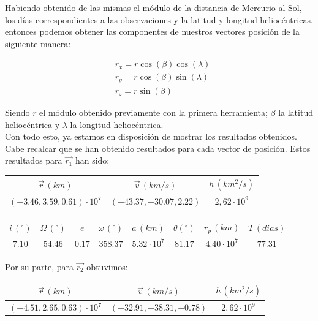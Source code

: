 \documentclass{article}
\numberwithin{equation}{section}
\begin{document}
Habiendo obtenido de las mismas el módulo de la distancia de Mercurio al Sol, los días correspondientes a las observaciones y la latitud y longitud heliocéntricas, entonces podemos obtener las componentes de nuestros vectores posición de la siguiente manera:

\begin{align*}
    &r_{x}=r\cos(\beta)\cos(\lambda) \\
    &r_{y}=r\cos(\beta)\sin(\lambda) \\
    &r_{z}=r\sin(\beta)
\end{align*}

Siendo $r$ el módulo obtenido previamente con la primera herramienta; 
$\beta$ la latitud heliocéntrica y $\lambda$ la longitud heliocéntrica. \\

Con todo esto, ya estamos en disposición de mostrar 
los resultados obtenidos. Cabe recalcar que se han obtenido resultados 
para cada vector de posición. Estos resultados para $\overrightarrow{r_{1}}$ han sido: 

\begin{center}
    \centering
    \begin{tabular}{|c|c|c|}
    \hline
    $\overrightarrow{r}\, (km)$ & $\overrightarrow{v}\, (km/s)$ & $h\, ( km^{2}/s)$  \\ \hline
    $(-3.46,3.59,0.61)\cdot10^7$ & $(-43.37, -30.07, 2.22)$ & $2,62 \cdot 10^{9}$\\ \hline
    \end{tabular}
\end{center}

\begin{center}
    \centering
    \begin{tabular}{|c|c|c|c|c|c|c|c|}
    \hline
     $i\, (^{\circ})$ & $\Omega\, (^\circ)$ & $e$ & $\omega\, (^\circ)$ & $a\, (km)$ & $\theta (^\circ)$ & $r_{p}\, (km)$ & $T\, (dias)$\\ \hline
    $7.10$ & $54.46$ & $0.17$ & $358.37$ & $5.32\cdot 10^{7}$ & $81.17$ & $4.40\cdot 10^{7}$ & $77.31$ \\ \hline
    \end{tabular}
\end{center}
Por su parte, para $\overrightarrow{r_{2}}$ obtuvimos:

\begin{center}
    \centering
    \begin{tabular}{|c|c|c|}
    \hline
    $\overrightarrow{r}\, (km)$ & $\overrightarrow{v}\, (km/s)$ & $h\, ( km^{2}/s)$  \\ \hline
    $(-4.51,2.65,0.63)\cdot10^7$ & $(-32.91, -38.31, -0.78)$ & $2,62 \cdot 10^{9}$\\ \hline
    \end{tabular}
\end{center}
\end{document}
